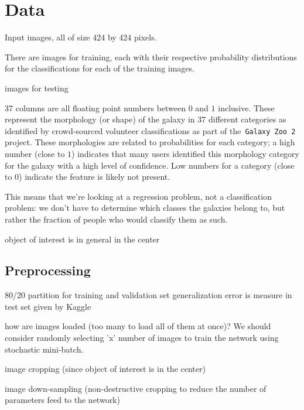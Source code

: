 \section{Data}

Input images, all of size 424 by 424 pixels.

There are  images for training, each with their respective probability distributions for the classifications for each of the training images.

 images for testing

37 columns are all floating point numbers between $0$ and $1$ inclusive. These represent the morphology (or shape) of the galaxy in 37 different categories as identified by crowd-sourced volunteer classifications as part of the~\texttt{Galaxy Zoo 2} project. These morphologies are related to probabilities for each category; a high number (close to $1$) indicates that many users identified this morphology category for the galaxy with a high level of confidence. Low numbers for a category (close to $0$) indicate the feature is likely not present.

This means that we’re looking at a regression problem, not a classification problem: we don’t have to determine which classes the galaxies belong to, but rather the fraction of people who would classify them as such.

object of interest is in general in the center

\subsection{Preprocessing}

80/20 partition for training and validation set
generalization error is measure in test set given by Kaggle

how are images loaded (too many to load all of them at once)? We should consider randomly selecting 'x' number of images to train the network using stochastic mini-batch.

image cropping (since object of interest is in the center)

image down-sampling (non-destructive cropping to reduce the number of parameters feed to the network)

